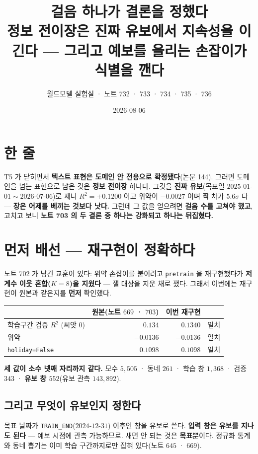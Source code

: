 \documentclass[10pt,a4paper]{article}
\title{\bfseries 걸음 하나가 결론을 정했다\\[2pt]
\large 정보 전이장은 진짜 유보에서 지속성을 이긴다 --- 그리고 예보를 올리는 손잡이가
식별을 깬다}
\author{월드모델 실험실 · 노트 732 · 733 · 734 · 735 · 736}
\date{2026-08-06}
\begin{document}
\maketitle

\section{한 줄}

T5 가 닫히면서 \textbf{텍스트 표현은 도메인 안 전용으로 확정됐다}(논문 144). 그러면
도메인을 넘는 표현으로 남은 것은 \textbf{정보 전이장} 하나다. 그것을 \textbf{진짜
유보}(목표일 $2025$-$01$-$01 \sim 2026$-$07$-$06$)로 재니 \textbf{$R^2 = +0.1200$}
이고 위약이 $-0.0027$ 이며 짝 차가 \textbf{$5.6\sigma$} 다 --- \textbf{장은 어제를
베끼는 것보다 낫다.} 그런데 그 값을 얻으려면 \textbf{걸음 수를 고쳐야 했고}, 고치고
보니 \textbf{노트 703 의 두 결론 중 하나는 강화되고 하나는 뒤집혔다.}

\section{먼저 배선 --- 재구현이 정확하다}

노트 702 가 남긴 교훈이 있다: 위약 손잡이를 붙이려고 \texttt{pretrain} 을
재구현했다가 \textbf{저계수 이웃 혼합($K{=}8$)을 지웠다} --- 잴 대상을 지운 채로
쟀다. 그래서 이번에는 재구현이 원본과 같은지를 \textbf{먼저} 확인했다.

\begin{center}
\begin{tabular}{lrrl}
\toprule
& 원본(노트 $669$ · $703$) & 이번 재구현 & \\
\midrule
학습구간 검증 $R^2$ (씨앗 $0$) & $0.134$ & $\mathbf{0.1340}$ & 일치 \\
위약 & $-0.0136$ & $\mathbf{-0.0136}$ & 일치 \\
\texttt{holiday=False} & $0.1098$ & $\mathbf{0.1098}$ & 일치 \\
\bottomrule
\end{tabular}
\end{center}

\textbf{세 값이 소수 넷째 자리까지 같다.} 모수 $5{,}505$ · 동네 $261$ · 학습 창
$1{,}368$ · 검증 $343$ · \textbf{유보 창 $552$}(유보 관측 $143{,}892$).

\subsection*{그리고 무엇이 유보인지 정한다}

목표 날짜가 \texttt{TRAIN\_END}($2024$-$12$-$31$) 이후인 창을 유보로 쓴다.
\textbf{입력 창은 유보를 지나도 된다} --- 예보 시점에 관측 가능하므로. 새면 안 되는
것은 \textbf{목표}뿐이다. 정규화 통계와 동네 뽑기는 이미 학습 구간까지로만
잡혀 있다(노트 $645$ · $669$).
\end{document}
